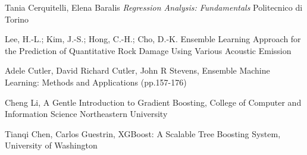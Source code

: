 \documentclass[12pt,a4paper,openright,twoside]{report}
\begin{document}
\begin{thebibliography}{90}
 Tania Cerquitelli, Elena Baralis
\emph{Regression Analysis: Fundamentals}
Politecnico di Torino

 Lee, H.-L.; Kim, J.-S.; Hong,
C.-H.; Cho, D.-K. Ensemble Learning
Approach for the Prediction of
Quantitative Rock Damage Using
Various Acoustic Emission

 Adele Cutler, David Richard Cutler, John R Stevens,
Ensemble Machine Learning: Methods and Applications (pp.157-176)

 Cheng Li,
A Gentle Introduction to Gradient Boosting,
College of Computer and Information Science
Northeastern University

Tianqi Chen, Carlos Guestrin, 
XGBoost: A Scalable Tree Boosting System, 
University of Washington

\end{thebibliography}
\end{document}
